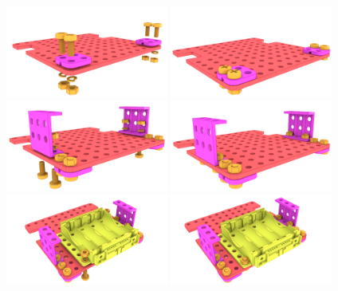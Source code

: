 \documentclass[twoside,a5paper,8pt]{article}
\begin{document}
  \includegraphics[height=30mm]{blender-render/render-instr/07-bottom-block1-dev.png}
  \includegraphics[height=30mm]{blender-render/render-instr/08-bottom-block1.png} \\
  \includegraphics[height=30mm]{blender-render/render-instr/09-bottom-block2-dev.png}
  \includegraphics[height=30mm]{blender-render/render-instr/10-bottom-block2.png} \\
  \includegraphics[height=30mm]{blender-render/render-instr/11-bottom-block3-dev.png}
  \includegraphics[height=30mm]{blender-render/render-instr/12-bottom-block3.png} \\
\end{document}
